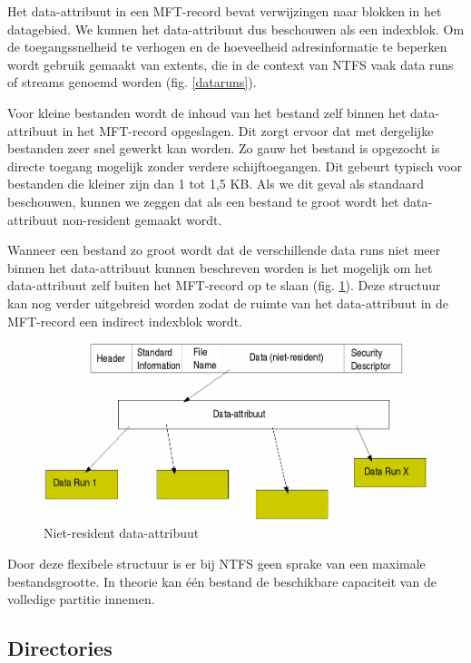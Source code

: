 Het data-attribuut in een MFT-record bevat verwijzingen naar
blokken in het datagebied. We kunnen het data-attribuut dus beschouwen
als een indexblok. Om de toegangssnelheid te verhogen en de
hoeveelheid adresinformatie te beperken wordt gebruik gemaakt van
extents, die in de context van NTFS vaak data runs of streams genoemd
worden (fig. \ref{dataruns}).

Voor kleine bestanden wordt de inhoud van het bestand zelf
binnen het data-attribuut in het MFT-record opgeslagen. Dit zorgt
ervoor dat met dergelijke bestanden zeer snel gewerkt kan worden. Zo
gauw het bestand is opgezocht is directe toegang mogelijk zonder
verdere schijftoegangen. Dit gebeurt typisch voor bestanden die
kleiner zijn dan 1 tot 1,5 KB. Als we dit geval als standaard
beschouwen, kunnen we zeggen dat als een bestand te groot wordt het
data-attribuut non-resident gemaakt wordt.

Wanneer een bestand zo groot wordt dat de verschillende data
runs niet meer binnen het data-attribuut kunnen beschreven worden is
het mogelijk om het data-attribuut zelf buiten het MFT-record op te
slaan (fig. \ref{nonresdata}). Deze structuur kan nog verder uitgebreid worden zodat de ruimte
van het data-attribuut in de MFT-record een indirect indexblok
wordt.

\begin{figure}
\begin{center}
\includegraphics[width=120mm]{images/fig0418.png}
\caption{Niet-resident data-attribuut}
\label{nonresdata}
\end{center}
\end{figure}

Door deze flexibele structuur is er bij NTFS geen sprake van een
maximale bestandsgrootte. In theorie kan \'e\'en bestand de beschikbare
capaciteit van de volledige partitie innemen.

\subsection{Directories}

